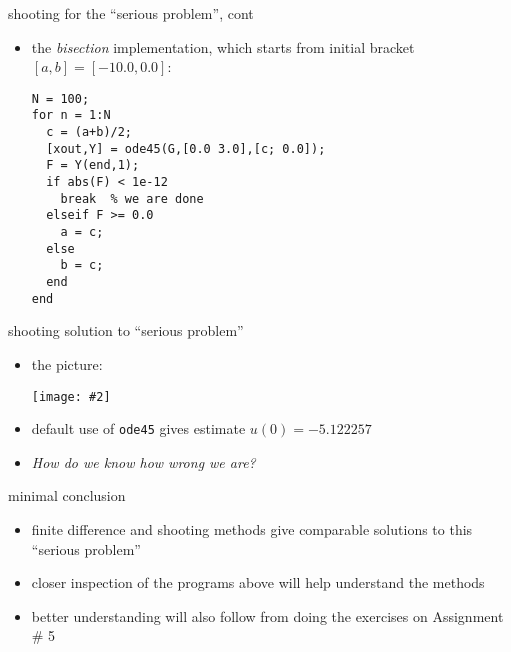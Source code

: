 \documentclass[10pt,hyperref]{beamer}
\newcommand{\centerimage}[2]{\begin{center}
\texttt{[image: \#2]}
\end{center}}
\begin{document}
\begin{frame}[fragile]{shooting for the ``serious problem'', cont} 

\begin{itemize}
\item the \emph{bisection} implementation, which starts from initial bracket $[a,b]=[-10.0,0.0]$:
\medskip

\small
\begin{verbatim}
N = 100;
for n = 1:N
  c = (a+b)/2;
  [xout,Y] = ode45(G,[0.0 3.0],[c; 0.0]);
  F = Y(end,1);
  if abs(F) < 1e-12 
    break  % we are done
  elseif F >= 0.0 
    a = c;
  else
    b = c;
  end
end
\end{verbatim}
\normalsize
\end{itemize}
\end{frame}


\begin{frame}{shooting solution to ``serious problem''} 

\begin{itemize}
\item the picture:

\centerimage{0.7}{resultSHOOT-crop}
\item default use of \texttt{ode45} gives estimate $u(0)=-5.122257$
\item  \emph{How do we know how wrong we are?}
\end{itemize}
\end{frame}


\begin{frame}{minimal conclusion} 

\begin{itemize}
\item finite difference and shooting methods give comparable solutions to this  ``serious problem''
\item closer inspection of the programs above will help understand the methods
\item better understanding will also follow from doing the exercises on \alert{Assignment \# 5}
\end{itemize}
\end{frame}
\end{document}
